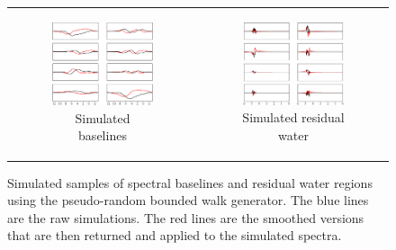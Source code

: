 \begin{figure}[b!]
    \centering
    \begin{tabular}[l]{cc}
    \begin{subfigure}{0.49\textwidth}
        \centering
        \includegraphics[width=0.95\textwidth,keepaspectratio]{images/random_walks/baseline_walks_edited.eps}
        \caption{Simulated baselines}
        \label{fig:baseline_region}
    \end{subfigure} &
    
    \begin{subfigure}{0.49\textwidth}
        \centering
        \includegraphics[width=0.95\textwidth,keepaspectratio]{images/random_walks/reswater_walks_edited.eps}
        \caption{Simulated residual water}
        \label{fig:reswater_region}
    \end{subfigure}
    \end{tabular}
    \caption{Simulated  samples of spectral baselines and residual water regions using the pseudo-random bounded walk generator. The blue lines are the raw simulations. The red lines are the smoothed versions that are then returned and applied to the simulated spectra.}
    \label{fig:random walk generator}
\end{figure}
